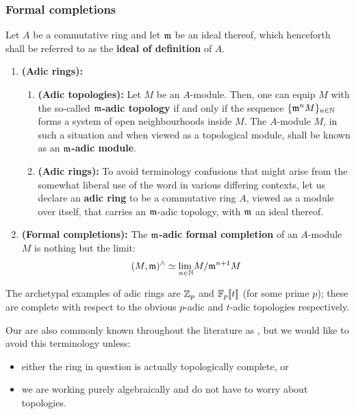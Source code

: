         \subsubsection{Formal completions}
            \begin{definition} \label{def: adic_modules}
                Let $A$ be a commutative ring and let $\mathfrak{m}$ be an ideal thereof, which henceforth shall be referred to as the \textbf{ideal of definition} of $A$.
                    \begin{enumerate}
                        \item \textbf{(Adic rings):} 
                            \begin{enumerate}
                                \item \textbf{(Adic topologies):} Let $M$ be an $A$-module. Then, one can equip $M$ with the so-called \textbf{$\mathfrak{m}$-adic topology} if and only if the sequence $\{\mathfrak{m}^nM\}_{n \in \mathbb{N}}$ forms a system of open neighbourhoods inside $M$. The $A$-module $M$, in such a situation and when viewed as a topological module, shall be known as an \textbf{$\mathfrak{m}$-adic module}.
                                \item \textbf{(Adic rings):} To avoid terminology confusions that might arise from the somewhat liberal use of the word  in various differing contexts, let us declare an \textbf{adic ring} to be a commutative ring $A$, viewed as a module over itself, that carries an $\mathfrak{m}$-adic topology, with $\mathfrak{m}$ an ideal thereof. 
                            \end{enumerate}
                        \item \textbf{(Formal completions):} The \textbf{$\mathfrak{m}$-adic formal completion} of an $A$-module $M$ is nothing but the limit:
                            $$(M, \mathfrak{m})^{\wedge} \simeq \underset{n \in \mathbb{N}}{\operatorname{lim} \:} M/\mathfrak{m}^{n + 1}M$$
                    \end{enumerate}
            \end{definition}
            \begin{example}
                The archetypal examples of adic rings are $\mathbb{Z}_p$ and $\mathbb{F}_p[\![t]\!]$ (for some prime $p$); these are complete with respect to the obvious $p$-adic and $t$-adic topologies respectively.
            \end{example}
            \begin{remark}
                Our  are also commonly known throughout the literature as , but we would like to avoid this terminology unless:
                    \begin{itemize}
                        \item either the ring in question is actually topologically complete, or
                        \item we are working purely algebraically and do not have to worry about topologies.
                    \end{itemize}
            \end{remark}
            
